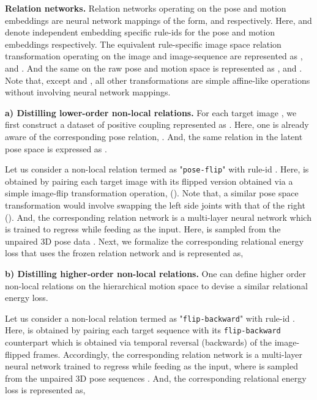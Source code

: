 \documentclass{article}
\begin{document}
\textbf{Relation networks.} Relation networks operating on the pose and motion embeddings are neural network mappings of the form,  and   respectively. Here,  and  denote independent embedding specific rule-ids for the pose and motion embeddings respectively. The equivalent rule-specific {image space relation transformation} operating on the image and image-sequence are represented as , and  . And the same on the raw pose and motion space is represented as , and  . Note that, except  and , all other transformations are simple affine-like operations without involving neural network mappings. 

\textbf{a) Distilling lower-order non-local relations.} For each target image , we first construct a dataset of positive coupling represented as  
. Here, one is already aware of the corresponding pose relation, \ie . And, the same relation in the latent pose space is expressed as . 



Let us consider a non-local relation termed as "\texttt{pose-flip}" with rule-id . Here,  is obtained by pairing each target image with its flipped version obtained via a simple image-flip transformation operation, (\ie ). Note that, a similar pose space transformation would involve swapping the left side joints with that of the right (\ie ). And, the corresponding relation network  is a multi-layer neural network which is trained to regress  while feeding  as the input. Here,  is sampled from the unpaired 3D pose data . Next, we formalize the corresponding relational energy loss that uses the frozen relation network  and is represented as,

\vspace{-1mm}
\noindent
\vspace{-3mm}

\textbf{b) Distilling higher-order non-local relations.} One can define higher order non-local relations on the hierarchical motion space to devise a similar relational energy loss. 



Let us consider a non-local relation termed as "\texttt{flip-backward}" with rule-id . Here,  is obtained by pairing each target sequence  with its \texttt{flip-backward} counterpart which is obtained via temporal reversal (backwards) of the image-flipped frames. Accordingly, the corresponding relation network  is a multi-layer neural network trained to regress  while feeding  as the input, where  is sampled from the unpaired 3D pose sequences . And, the corresponding relational energy loss is represented as,
\end{document}
